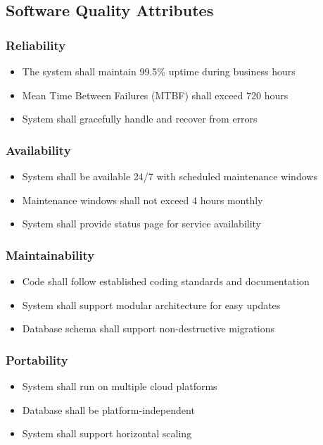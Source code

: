 \documentclass[12pt,a4paper]{article}
\begin{document}
\subsection{Software Quality Attributes}
\subsubsection{Reliability}
\begin{itemize}
    \item The system shall maintain 99.5\% uptime during business hours
    \item Mean Time Between Failures (MTBF) shall exceed 720 hours
    \item System shall gracefully handle and recover from errors
\end{itemize}

\subsubsection{Availability}
\begin{itemize}
    \item System shall be available 24/7 with scheduled maintenance windows
    \item Maintenance windows shall not exceed 4 hours monthly
    \item System shall provide status page for service availability
\end{itemize}

\subsubsection{Maintainability}
\begin{itemize}
    \item Code shall follow established coding standards and documentation
    \item System shall support modular architecture for easy updates
    \item Database schema shall support non-destructive migrations
\end{itemize}

\subsubsection{Portability}
\begin{itemize}
    \item System shall run on multiple cloud platforms
    \item Database shall be platform-independent
    \item System shall support horizontal scaling
\end{itemize}
\end{document}
